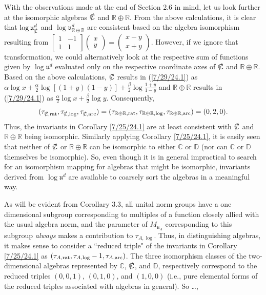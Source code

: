 \documentclass{amsart}
\numberwithin{equation}{section}
\theoremstyle{definition}
\numberwithin{theorem}{section}
\begin{document}
With the observations made at the end of Section 2.6 in mind, let us look further at the isomorphic algebras $\slashed{\mathbb{C}}$ and $\mathbb{R}\oplus\mathbb{R}$.  From the above calculations, it is clear that $\log\mathfrak{u}^d_{\slashed{\mathbb{C}}}$ and $\log\mathfrak{u}^d_{\mathbb{R}\oplus\mathbb{R}}$ are consistent based on the algebra isomorphism resulting from $\left[\begin{array}{ccc}
 1 & -1   \\ 
 1 & 1    
\end{array}\right]\left(\begin{array}{ccc}
x   \\ 
y   
\end{array}\right) = \left(\begin{array}{ccc}
x-y   \\ 
x+y   
\end{array}\right)$.  However, if we ignore that transformation, we could alternatively look at the respective sum of functions given by $\log\mathfrak{u}^d$ evaluated only on the respective coordinate axes of $\slashed{\mathbb{C}}$ and $\mathbb{R}\oplus\mathbb{R}$.  Based on the above calculations, $\slashed{\mathbb{C}}$ results in (\ref{7/29/24.1}) as $\alpha\log x+ \frac{\alpha}{2}\log[(1+
y)(1-y)] +  \frac{\beta}{2}\log \frac{1+y}{1-y}$ and $\mathbb{R}\oplus\mathbb{R}$ results in (\ref{7/29/24.1}) as $\frac{\alpha}{2}\log x +\frac{\beta}{2} \log y$. Consequently,  \[(\tau_{\slashed{\mathbb{C}},{\rm rat}},\tau_{\slashed{\mathbb{C}},{\rm log}},\tau_{\slashed{\mathbb{C}},{\rm arc}}) = (\tau_{\mathbb{R}\oplus\mathbb{R},{\rm rat}},\tau_{\mathbb{R}\oplus\mathbb{R},{\rm log}},\tau_{\mathbb{R}\oplus\mathbb{R},{\rm arc}}) = (0,2,0). \] Thus, the invariants in Corollary \ref{7/25/24.1} are at least consistent with $\slashed{\mathbb{C}}$ and $\mathbb{R}\oplus\mathbb{R}$ being isomorphic.  Similarly applying Corollary \ref{7/25/24.1}, it is easily seen that neither of $\slashed{\mathbb{C}}$ or $\mathbb{R}\oplus\mathbb{R}$ can be isomorphic to either $\mathbb{C}$ or $\mathbb{D}$ (nor can  $\mathbb{C}$ or $\mathbb{D}$ themselves be isomorphic).   So, even though it is in general impractical to search for an isomorphism mapping for algebras that might be isomorphic, invariants derived from $\log\mathfrak{u}^d$ are available to coarsely sort the algebras in a meaningful way.



As will be evident from Corollary 3.3, all unital norm groups have a one dimensional subgroup corresponding to multiples of a function closely allied with the usual algebra norm, and the parameter of $M_{\mathfrak{u}_A}$ corresponding to this subgroup {\it always} makes a contribution to $\tau_{A,\log}$.  Thus, in distinguishing algebras, it makes sense to consider a ``reduced triple" of the invariants in Corollary \ref{7/25/24.1} as $(\tau_{A,{\rm rat}},\tau_{A,{\rm log}}-1,\tau_{A,{\rm arc}})$. 
 The three isomorphism classes of the two-dimensional algebras represented by $\mathbb{C}$, $\slashed{\mathbb{C}}$, and $\mathbb{D}$, respectively correspond to the reduced triples  $(0,0,1)$, $(0,1,0)$, and $(1,0,0)$ (i.e., pure elemental forms of the reduced triples associated with algebras in general).  So \dots,
 
\end{document}
